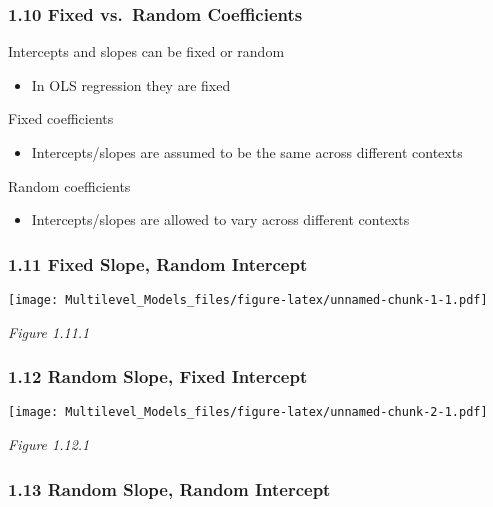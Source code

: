 \documentclass[
]{article}
\providecommand{\tightlist}{%
  \setlength{\itemsep}{0pt}\setlength{\parskip}{0pt}}
\begin{document}
\hypertarget{fixed-vs.-random-coefficients}{%
\subsubsection{1.10 Fixed vs.~Random
Coefficients}\label{fixed-vs.-random-coefficients}}

Intercepts and slopes can be fixed or random

\begin{itemize}
\tightlist
\item
  In OLS regression they are fixed
\end{itemize}

Fixed coefficients

\begin{itemize}
\tightlist
\item
  Intercepts/slopes are assumed to be the same across different contexts
\end{itemize}

Random coefficients

\begin{itemize}
\tightlist
\item
  Intercepts/slopes are allowed to vary across different contexts
\end{itemize}

\hypertarget{fixed-slope-random-intercept}{%
\subsubsection{1.11 Fixed Slope, Random
Intercept}\label{fixed-slope-random-intercept}}

\texttt{[image: Multilevel\_Models\_files/figure-latex/unnamed-chunk-1-1.pdf]}

\emph{Figure 1.11.1}

\hypertarget{random-slope-fixed-intercept}{%
\subsubsection{1.12 Random Slope, Fixed
Intercept}\label{random-slope-fixed-intercept}}

\texttt{[image: Multilevel\_Models\_files/figure-latex/unnamed-chunk-2-1.pdf]}

\emph{Figure 1.12.1}

\hypertarget{random-slope-random-intercept}{%
\subsubsection{1.13 Random Slope, Random
Intercept}\label{random-slope-random-intercept}}
\end{document}
